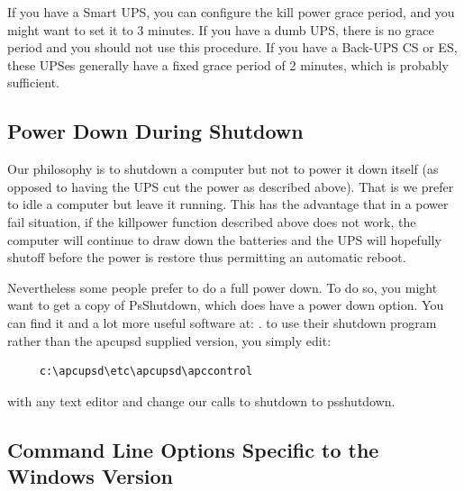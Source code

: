 {{{{{{{If you have a Smart UPS, you can configure the kill power grace period, and
you might want to set it to 3 minutes. If you have a dumb UPS, there is no
grace period and you should not use this procedure. If you have a Back-UPS CS
or ES, these UPSes generally have a fixed grace period of 2 minutes, which is
probably sufficient. 

\label{Power-Down-During-Shutdown}

\subsection*{Power Down During Shutdown}

\label{index-Windows_002c-Power-down-184}
\label{index-Power-down_002c-Windows-185}
Our philosophy is to shutdown a computer but not to power it down itself (as
opposed to having the UPS cut the power as described above). That is we prefer
to idle a computer but leave it running. This has the advantage that in a
power fail situation, if the killpower function described above does not work,
the computer will continue to draw down the batteries and the UPS will
hopefully shutoff before the power is restore thus permitting an automatic
reboot.  

Nevertheless some people prefer to do a full power down. To do so, you might
want to get a copy of PsShutdown, which does have a power down option. You can
find it and a lot more useful software at: 
. to use their shutdown program
rather than the apcupsd supplied version, you simply edit: 

\footnotesize
\begin{verbatim}
     c:\apcupsd\etc\apcupsd\apccontrol
\end{verbatim}
\normalsize

with any text editor and change our calls to shutdown to psshutdown. 

\label{Command-Line-Options-Specific-to-the-Windows-Version}

\subsection*{Command Line Options Specific to the Windows Version}

}}}}}}}
